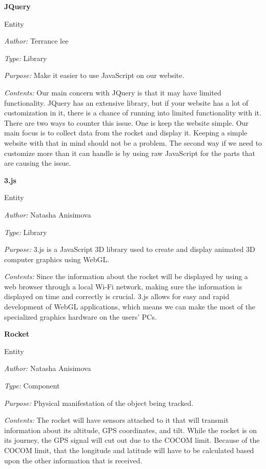 \documentclass[10pt,draftclsnofoot,onecolumn]{IEEEtran}
\newcommand{\newentity}[5]{

	\noindent\textbf{#2}
	
	\noindent Entity
	
	\noindent\textit{Author:} {#1}
		
	\noindent\textit{Type:} {#3}
	
	\noindent\textit{Purpose:} {#4}

	\noindent\textit{Contents:} {#5}
	\vspace{.5cm}

}
\begin{document}
	
	\newentity
	{Terrance lee}
	{JQuery}
	{Library}
	{Make it easier to use JavaScript on our website. }
	{Our main concern with JQuery is that it may have limited functionality.  JQuery has an extensive library, but if your website has a lot of customization in it, there is a chance of running into limited functionality with it.  There are two ways to counter this issue.  One is keep the website simple.  Our main focus is to collect data from the rocket and display it.  Keeping a simple website with that in mind should not be a problem.  The second way if we need to customize more than it can handle is by using raw JavaScript for the parts that are causing the issue.}
	
	\newentity
	{Natasha Anisimova}
	{3.js}
	{Library}
	{3.js is a JavaScript 3D library used to create and display animated 3D computer graphics using WebGL.}
	{	Since the information about the rocket will be displayed by using a web browser through a local Wi-Fi network, 
		making sure the information is displayed on time and correctly is crucial. 3.js allows for easy and rapid development
		of WebGL applications, which means we can make the most of the specialized graphics hardware on the users'
		PCs.
	}


	\newentity
	{Natasha Anisimova}
	{Rocket}
	{Component}
	{Physical manifestation of the object being tracked.}
	{
		The rocket will have sensors attached to it that will transmit information about its altitude, GPS coordinates, and tilt.
		While the rocket is on its journey, the GPS signal will cut out due to the COCOM limit.
		Because of the COCOM limit, that the longitude
		and latitude will have to be calculated based upon the other information that is received. 
	}
	
\end{document}
